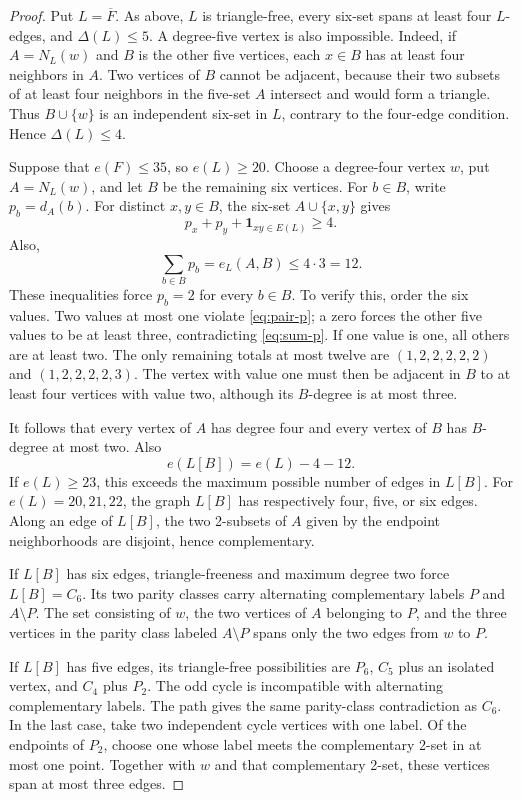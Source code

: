 \documentclass[11pt,reqno,a4paper]{amsart}
\theoremstyle{definition}
\theoremstyle{remark}
\newcommand{\comp}[1]{\overline{#1}}
\newcommand{\one}{\mathbf{1}}
\begin{document}
\begin{proof}
Put $L=\comp F$.  As above, $L$ is triangle-free, every six-set spans at
least four $L$-edges, and $\Delta(L)\leq5$.  A degree-five vertex is also
impossible.  Indeed, if $A=N_L(w)$ and $B$ is the other five vertices, each
$x\in B$ has at least four neighbors in $A$.  Two vertices of $B$ cannot be
adjacent, because their two subsets of at least four neighbors in the
five-set $A$ intersect and would form a triangle.  Thus $B\cup\{w\}$ is an
independent six-set in $L$, contrary to the four-edge condition.  Hence
$\Delta(L)\leq4$.

Suppose that $e(F)\leq35$, so $e(L)\geq20$.  Choose a degree-four vertex
$w$, put $A=N_L(w)$, and let $B$ be the remaining six vertices.  For
$b\in B$, write $p_b=d_A(b)$.  For distinct $x,y\in B$, the six-set
$A\cup\{x,y\}$ gives
\begin{equation}\label{eq:pair-p}
  p_x+p_y+\one_{xy\in E(L)}\geq4.
\end{equation}
Also,
\begin{equation}\label{eq:sum-p}
  \sum_{b\in B}p_b=e_L(A,B)\leq4\cdot3=12.
\end{equation}
These inequalities force $p_b=2$ for every $b\in B$.  To verify this, order
the six values.  Two values at most one violate \eqref{eq:pair-p}; a zero
forces the other five values to be at least three, contradicting
\eqref{eq:sum-p}.  If one value is one, all others are at least two.  The
only remaining totals at most twelve are $(1,2,2,2,2,2)$ and
$(1,2,2,2,2,3)$.  The vertex with value one must then be adjacent in $B$ to
at least four vertices with value two, although its $B$-degree is at most
three.

It follows that every vertex of $A$ has degree four and every vertex of $B$
has $B$-degree at most two.  Also
\[
  e(L[B])=e(L)-4-12.
\]
If $e(L)\geq23$, this exceeds the maximum possible number of edges in
$L[B]$.  For $e(L)=20,21,22$, the graph $L[B]$ has respectively four,
five, or six edges.  Along an edge of $L[B]$, the two 2-subsets of $A$ given
by the endpoint neighborhoods are disjoint, hence complementary.

If $L[B]$ has six edges, triangle-freeness and maximum degree two force
$L[B]=C_6$.  Its two parity classes carry alternating complementary labels
$P$ and $A\setminus P$.  The set consisting of $w$, the two vertices of
$A$ belonging to $P$, and the three vertices in the parity class labeled
$A\setminus P$
spans only the two edges from $w$ to $P$.

If $L[B]$ has five edges, its triangle-free possibilities are $P_6$,
$C_5$ plus an isolated vertex, and $C_4$ plus $P_2$.  The odd cycle is
incompatible with alternating complementary labels.  The path gives the
same parity-class contradiction as $C_6$.  In the last case, take two
independent cycle vertices with one label.  Of the endpoints of $P_2$,
choose one whose label meets the complementary 2-set in at most one point.
Together with $w$ and that complementary 2-set, these vertices span at most
three edges.


\end{proof}
\end{document}
